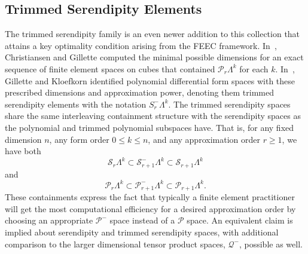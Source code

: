 \documentclass[manuscript,screen]{acmart}
\newcommand{\calP}{\mathcal{P}}
\newcommand{\calQ}{\mathcal{Q}}
\newcommand{\calS}{\mathcal{S}}
\begin{document}
  \subsection{Trimmed Serendipity Elements}
    The trimmed serendipity family is an even newer addition to this collection that attains a key optimality condition arising from the FEEC framework.
	In~\cite{christiansen2016constructions}, Christiansen and Gillette computed the minimal possible dimensions for an exact sequence of finite element spaces on cubes that contained $\calP_r\Lambda^k$ for each $k$.
	In~\cite{gillette2019trimmed}, Gillette and Kloefkorn identified polynomial differential form spaces with these prescribed dimensions and approximation power, denoting them trimmed serendipity elements with the notation $S^-_r\Lambda^k$.  
	The trimmed serendipity spaces share the same interleaving containment structure with the serendipity spaces as the polynomial and trimmed polynomial subspaces have.  That is, for any fixed dimension $n$, any form order $0\leq k\leq n$, and any approximation order $r\geq 1$, we have both
\begin{equation*}
      \calS_r \Lambda^k \subset \calS^-_{r+1} \Lambda^k \subset \calS_{r+1} \Lambda^k
  \end{equation*}
 \noindent and   
   \begin{equation*}
      \calP_r \Lambda^k \subset \calP^-_{r+1} \Lambda^k \subset \calP_{r+1} \Lambda^k.
  \end{equation*}
	These containments express the fact that typically a finite element practitioner will get the most computational efficiency for a desired approximation order by choosing an appropriate $\calP^-$ space instead of a $\calP$ space.
	An equivalent claim is implied about serendipity and trimmed serendipity spaces, with additional comparison to the larger dimensional tensor product spaces, $\calQ^-$, possible as well.


    
    
  
\end{document}
